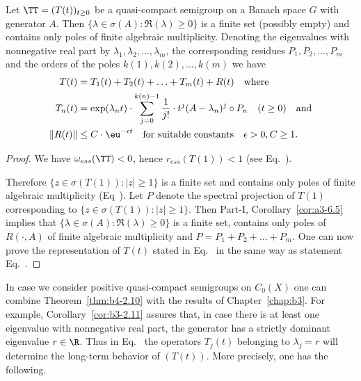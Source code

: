 \begin{theorem}\label{thm:b4-2.10}
	Let $\TT = (T(t))_{t \geq 0}$ be a quasi-compact semigroup on a Banach space $G$ with generator $A$. 
    Then $\{\lambda \in \sigma(A) \colon \Re(\lambda) \geq 0\}$ is a finite set (possibly empty) and contains only poles of finite algebraic multiplicity. 
    Denoting the eigenvalues with nonnegative real part by $\lambda_1,\lambda_2, \ldots ,\lambda_m$, the corresponding residues $P_1,P_2, \ldots ,P_m$ and the orders of the poles $k(1),k(2), \ldots, k(m)$ we have
	\begin{equation}\label{eq:b4-2.5}
		\begin{aligned}
		T(t) &= T_1(t) + T_2(t) + \ldots + T_m(t) + R(t) \quad \text{where}\\
		T_n(t) &= \exp(\lambda_nt) \cdot \sum_{j=0}^{k(n)-1} \frac{1}{j!} \cdot t^j (A - \lambda_n)^j \circ P_n \quad (t \geq 0) \quad \text{and}\\
		\|R(t)\| &\leq C \cdot \eu^{-\epsilon t} \quad \text{for suitable constants} \quad \epsilon > 0, C \geq 1 .		
		\end{aligned}
	\end{equation}
\end{theorem}
\begin{proof} We have $\omega_{ess}(\TT) < 0$, hence $r_{ess}(T(1)) < 1$ (see  Eq.~).

Therefore $\{z \in \sigma(T(1)) \colon |z| \geq 1\}$ is a finite set and contains only poles of finite algebraic multiplicity 
(\cf Eq~). 
Let $P$ denote the spectral projection of\/ $T(1)$ corresponding to $\{z \in \sigma(T(1))\colon |z| \geq 1\}$. 
Then Part-I, Corollary~\ref{cor:a3-6.5} implies that $\{\lambda \in \sigma(A) \colon \Re(\lambda) \geq 0\}$ is a finite set, contains only poles of\/ $R(\cdot,A)$ of finite algebraic multiplicity and $P = P_1+P_2+ \ldots +P_m$. 
One can now prove the representation of\/ $T(t)$ stated in Eq.~ in the same way as statement Eq.~.
\end{proof}
In case we consider positive quasi-compact semigroups on $C_{0}(X)$ one can combine Theorem~\ref{thm:b4-2.10} with the results of Chapter~\ref{chap:b3}. 
For example, Corollary~\ref{cor:b3-2.11} assures that, in case there is at least one eigenvalue with nonnegative real part, the generator has a strictly dominant eigenvalue $r \in \R$. 
Thus in Eq.~ the operators $T_j(t)$ belonging to $\lambda_j = r$ will determine the long-term behavior of\/ $(T(t))$. More precisely, one has the following.
